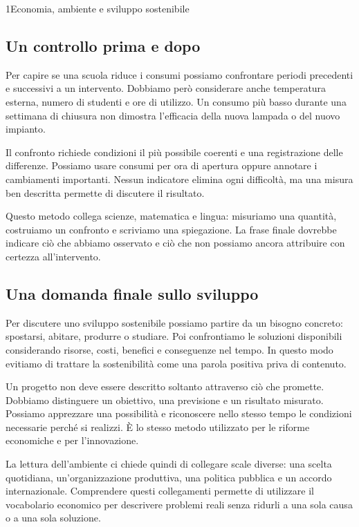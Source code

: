\begin{lettura}{1}{Economia, ambiente e sviluppo sostenibile}
\subsection*{Un controllo prima e dopo}
Per capire se una scuola riduce i consumi possiamo confrontare periodi precedenti e successivi a un intervento. Dobbiamo però considerare anche temperatura esterna, numero di studenti e ore di utilizzo. Un consumo più basso durante una settimana di chiusura non dimostra l'efficacia della nuova lampada o del nuovo impianto.

Il confronto richiede condizioni il più possibile coerenti e una registrazione delle differenze. Possiamo usare consumi per ora di apertura oppure annotare i cambiamenti importanti. Nessun indicatore elimina ogni difficoltà, ma una misura ben descritta permette di discutere il risultato.

Questo metodo collega scienze, matematica e lingua: misuriamo una quantità, costruiamo un confronto e scriviamo una spiegazione. La frase finale dovrebbe indicare ciò che abbiamo osservato e ciò che non possiamo ancora attribuire con certezza all'intervento.

\subsection*{Una domanda finale sullo sviluppo}
Per discutere uno sviluppo sostenibile possiamo partire da un bisogno concreto: spostarsi, abitare, produrre o studiare. Poi confrontiamo le soluzioni disponibili considerando risorse, costi, benefici e conseguenze nel tempo. In questo modo evitiamo di trattare la sostenibilità come una parola positiva priva di contenuto.

Un progetto non deve essere descritto soltanto attraverso ciò che promette. Dobbiamo distinguere un obiettivo, una previsione e un risultato misurato. Possiamo apprezzare una possibilità e riconoscere nello stesso tempo le condizioni necessarie perché si realizzi. È lo stesso metodo utilizzato per le riforme economiche e per l'innovazione.

La lettura dell'ambiente ci chiede quindi di collegare scale diverse: una scelta quotidiana, un'organizzazione produttiva, una politica pubblica e un accordo internazionale. Comprendere questi collegamenti permette di utilizzare il vocabolario economico per descrivere problemi reali senza ridurli a una sola causa o a una sola soluzione.




\end{lettura}
